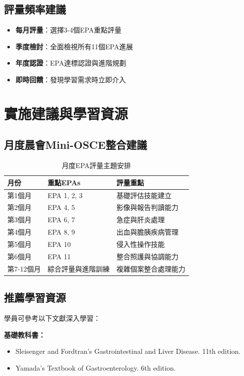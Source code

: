 \documentclass[12pt,a4paper]{article}
\begin{document}
\subsection{評量頻率建議}
\begin{itemize}[nosep]
    \item \textbf{每月評量}：選擇3-4個EPA重點評量
    \item \textbf{季度檢討}：全面檢視所有11個EPA進展
    \item \textbf{年度認證}：EPA達標認證與進階規劃
    \item \textbf{即時回饋}：發現學習需求時立即介入
\end{itemize}

\section{實施建議與學習資源}

\subsection{月度晨會Mini-OSCE整合建議}
\begin{table}[h]
    \centering
    \caption{月度EPA評量主題安排}
    \begin{tabular}{p{2.5cm} p{4.5cm} p{7cm}}
        \toprule
        \textbf{月份} & \textbf{重點EPAs} & \textbf{評量重點} \\
        \midrule
        第1個月 & EPA 1, 2, 3 & 基礎評估技能建立 \\
        第2個月 & EPA 4, 5 & 影像與報告判讀能力 \\
        第3個月 & EPA 6, 7 & 急症與肝炎處理 \\
        第4個月 & EPA 8, 9 & 出血與膽胰疾病管理 \\
        第5個月 & EPA 10 & 侵入性操作技能 \\
        第6個月 & EPA 11 & 整合照護與協調能力 \\
        第7-12個月 & 綜合評量與進階訓練 & 複雜個案整合處理能力 \\
        \bottomrule
    \end{tabular}
\end{table}

\subsection{推薦學習資源}
學員可參考以下文獻深入學習：

\textbf{基礎教科書：}
\begin{itemize}
    \item Sleisenger and Fordtran's Gastrointestinal and Liver Disease. 11th edition.
    \item Yamada's Textbook of Gastroenterology. 6th edition.
\end{itemize}
\end{document}
